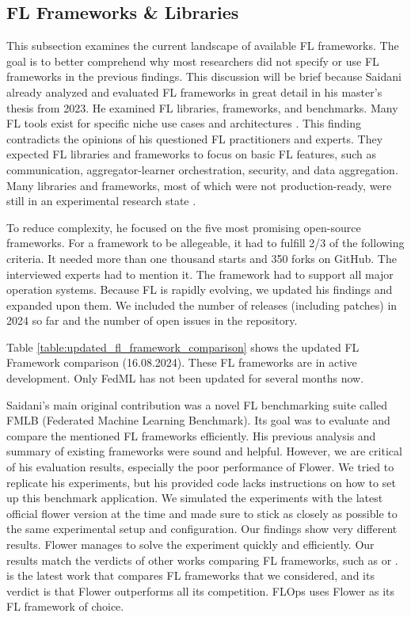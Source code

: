 \subsection{FL Frameworks \& Libraries}\label{subsection:fl_frameworks_and_libraries}

This subsection examines the current landscape of available FL frameworks.
The goal is to better comprehend why most researchers did not specify or use FL frameworks in the previous findings.
This discussion will be brief because Saidani already analyzed and evaluated FL frameworks in great detail in his master's thesis \cite{thesis:tum_fl_framework_comparison} from 2023.
He examined FL libraries, frameworks, and benchmarks.
Many FL tools exist for specific niche use cases and architectures \cite{thesis:tum_fl_framework_comparison}.
This finding contradicts the opinions of his questioned FL practitioners and experts.
They expected FL libraries and frameworks to focus on basic FL features, such as communication, aggregator-learner orchestration, security, and data aggregation.
Many libraries and frameworks, most of which were not production-ready, were still in an experimental research state \cite{thesis:tum_fl_framework_comparison}.

To reduce complexity, he focused on the five most promising open-source frameworks.
For a framework to be allegeable, it had to fulfill 2/3 of the following criteria.
It needed more than one thousand starts and 350 forks on GitHub.
The interviewed experts had to mention it.
The framework had to support all major operation systems.
Because FL is rapidly evolving, we updated his findings and expanded upon them.
We included the number of releases (including patches) in 2024 so far and the number of open issues in the repository.

Table \ref{table:updated_fl_framework_comparison} shows the updated FL Framework comparison (16.08.2024).
These FL frameworks are in active development. 
Only FedML has not been updated for several months now.

Saidani's main original contribution was a novel FL benchmarking suite called FMLB (Federated Machine Learning Benchmark).
Its goal was to evaluate and compare the mentioned FL frameworks efficiently.
His previous analysis and summary of existing frameworks were sound and helpful.
However, we are critical of his evaluation results, especially the poor performance of Flower.
We tried to replicate his experiments, but his provided code \cite{tum_fl_framework_thesis_github} lacks instructions on how to set up this benchmark application.
We simulated the experiments with the latest official flower version at the time and made sure to stick as closely as possible to the same experimental setup and configuration.
Our findings show very different results.
Flower manages to solve the experiment quickly and efficiently.
Our results match the verdicts of other works comparing FL frameworks, such as \cite{comparative_analysis_of_fl_frameworks} or \cite{comprehensive_study_fl_frameworks_degree_project}.
\cite{comparative_analysis_of_fl_frameworks} is the latest work that compares FL frameworks that we considered, and its verdict is that Flower outperforms all its competition.
FLOps uses Flower as its FL framework of choice.